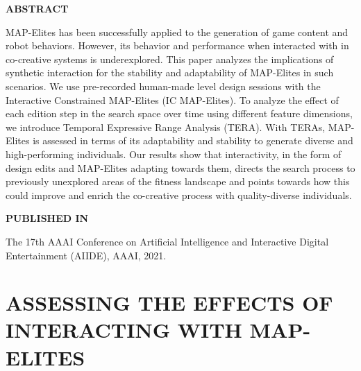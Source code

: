 \graphicspath{{included-papers-tex/paper-9/}}



\normalfont
\textbf{\textsc{ABSTRACT}}

MAP-Elites has been successfully applied to the generation of game content and robot behaviors. However, its behavior and performance when interacted with in co-creative systems is underexplored. This paper analyzes the implications of synthetic interaction for the stability and adaptability of MAP-Elites in such scenarios. We use pre-recorded human-made level design sessions with the Interactive Constrained MAP-Elites (IC MAP-Elites). To analyze the effect of each edition step in the search space over time using different feature dimensions, we introduce Temporal Expressive Range Analysis (TERA). With TERAs, MAP-Elites is assessed in terms of its adaptability and stability to generate diverse and high-performing individuals. Our results show that interactivity, in the form of design edits and MAP-Elites adapting towards them, directs the search process to previously unexplored areas of the fitness landscape and points towards how this could improve and enrich the co-creative process with quality-diverse individuals.

\textbf{\textsc{PUBLISHED IN}}

The 17th AAAI Conference on Artificial Intelligence and Interactive Digital Entertainment (AIIDE), AAAI, 2021.

\section*{ASSESSING THE EFFECTS OF \\ INTERACTING WITH MAP-ELITES}




% 

% 




